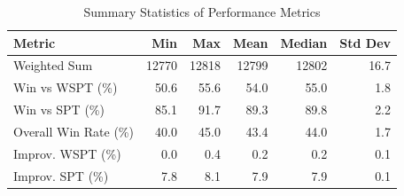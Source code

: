 \begin{table}[htbp]%
\centering%
\begin{tabular}{lrrrrr}%
\toprule%
\textbf{Metric}&\textbf{Min}&\textbf{Max}&\textbf{Mean}&\textbf{Median}&\textbf{Std Dev}\\%
\midrule%
Weighted Sum&12770&12818&12799&12802&16.7\\%
Win vs WSPT (\%)&50.6&55.6&54.0&55.0&1.8\\%
Win vs SPT (\%)&85.1&91.7&89.3&89.8&2.2\\%
Overall Win Rate (\%)&40.0&45.0&43.4&44.0&1.7\\%
Improv. WSPT (\%)&0.0&0.4&0.2&0.2&0.1\\%
Improv. SPT (\%)&7.8&8.1&7.9&7.9&0.1\\%
\bottomrule%
\end{tabular}%
\caption{Summary Statistics of Performance Metrics}%
\label{tab:metrics}%
\end{table}